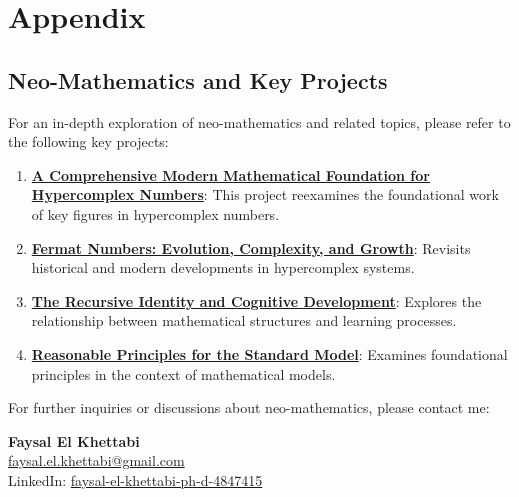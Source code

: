 \documentclass[12pt]{article}
\begin{document}
\section{Appendix}

\subsection{Neo-Mathematics and Key Projects}
For an in-depth exploration of neo-mathematics and related topics, please refer to the following key projects:
\begin{enumerate}
    \item \textbf{\href{https://efaysal.github.io/HCNFEK2024FE/HypComNumSetTheGCFEKFEB2024.pdf}{A Comprehensive Modern Mathematical Foundation for Hypercomplex Numbers}}: This project reexamines the foundational work of key figures in hypercomplex numbers.
    \item \textbf{\href{https://efaysal.github.io/HCNFEK2024FE/BokanConwayHypComNumSetTheGCFEK2024.pdf}{Fermat Numbers: Evolution, Complexity, and Growth}}: Revisits historical and modern developments in hypercomplex systems.
    \item \textbf{\href{https://efaysal.github.io/HCNFEK2024FE/CONREASFEKAUGUST2024E.pdf}{The Recursive Identity and Cognitive Development}}: Explores the relationship between mathematical structures and learning processes.
    \item \textbf{\href{https://efaysal.github.io/HCNFEK2024FE/REASPRINCFEKAUGUST2000.pdf}{Reasonable Principles for the Standard Model}}: Examines foundational principles in the context of mathematical models.
\end{enumerate}

For further inquiries or discussions about neo-mathematics, please contact me:

\textbf{Faysal El Khettabi} \\
\href{mailto:faysal.el.khettabi@gmail.com}{faysal.el.khettabi@gmail.com} \\
LinkedIn: \href{https://www.linkedin.com/in/faysal-el-khettabi-ph-d-4847415/}{faysal-el-khettabi-ph-d-4847415}
\end{document}
